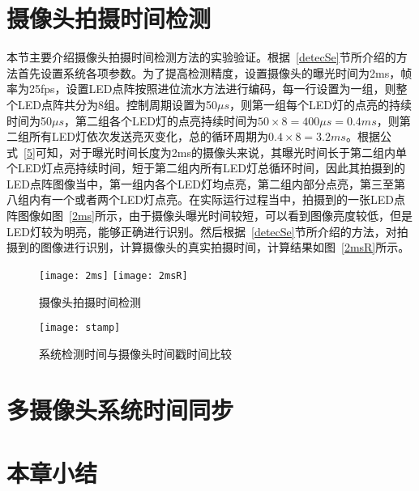 \section{摄像头拍摄时间检测}

本节主要介绍摄像头拍摄时间检测方法的实验验证。根据~\ref{detecSe}节所介绍的方法首先设置系统各项参数。为了提高检测精度，设置摄像头的曝光时间为2ms，帧率为25fps，设置LED点阵按照进位流水方法进行编码，每一行设置为一组，则整个LED点阵共分为8组。控制周期设置为50$\mu s$，则第一组每个LED灯的点亮的持续时间为50$\mu s$，第二组各个LED灯的点亮持续时间为$50 \times 8 = 400\mu s = 0.4ms$，则第二组所有LED灯依次发送亮灭变化，总的循环周期为$0.4 \times 8 = 3.2ms$。根据公式~\ref{5}可知，对于曝光时间长度为2ms的摄像头来说，其曝光时间长于第二组内单个LED灯点亮持续时间，短于第二组内所有LED灯总循环时间，因此其拍摄到的LED点阵图像当中，第一组内各个LED灯均点亮，第二组内部分点亮，第三至第八组内有一个或者两个LED灯点亮。在实际运行过程当中，拍摄到的一张LED点阵图像如图~\ref{2ms}所示，由于摄像头曝光时间较短，可以看到图像亮度较低，但是LED灯较为明亮，能够正确进行识别。然后根据~\ref{detecSe}节所介绍的方法，对拍摄到的图像进行识别，计算摄像头的真实拍摄时间，计算结果如图~\ref{2msR}所示。

\begin{figure}[h] 
  \centering%
    {\texttt{[image: 2ms]}}
      {\texttt{[image: 2msR]}}
  \caption{摄像头拍摄时间检测}
    
\end{figure}

\begin{figure}[h] 
  \centering
  \texttt{[image: stamp]}
  \caption{系统检测时间与摄像头时间戳时间比较}
    \label{stamp}
\end{figure}

\section{多摄像头系统时间同步}



\section{本章小结}





























































